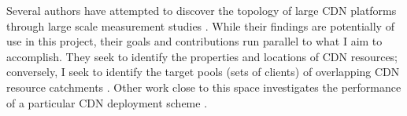 Several authors have attempted to discover the topology of large CDN platforms through large scale
measurement studies \cite{webcart, Calder2013, benson11}. While their findings are potentially of
use in this project, their goals and contributions run parallel to what I aim to accomplish. They
seek to identify the properties and locations of CDN resources; conversely, I seek to identify the
target pools (sets of clients) of overlapping CDN resource catchments \cite{webcart, Calder2013,
benson11}. Other work close to this space investigates the performance of a particular CDN
deployment scheme \cite{ecs15sigcomm}. 
